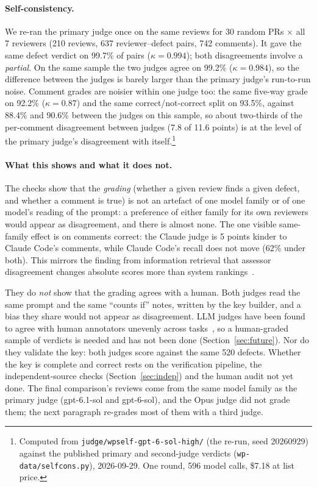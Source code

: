 \documentclass[11pt,a4paper]{article}
\newcommand{\code}[1]{\texttt{#1}}
\begin{document}
\paragraph{Self-consistency.} We re-ran the primary judge once on the same
reviews for 30 random PRs $\times$ all 7 reviewers (210 reviews, 637
reviewer--defect pairs, 742 comments). It gave the same defect verdict on
99.7\% of pairs ($\kappa = 0.994$); both disagreements involve a
\emph{partial}. On the same sample the two judges agree on 99.2\% ($\kappa =
0.984$), so the difference between the judges is barely larger than the
primary judge's run-to-run noise. Comment grades are noisier within one
judge too: the same five-way grade on 92.2\% ($\kappa = 0.87$) and the same
correct/not-correct split on 93.5\%, against 88.4\% and 90.6\% between the
judges on this sample, so about two-thirds of the per-comment disagreement
between judges (7.8 of 11.6 points) is at the level of the primary judge's
disagreement with itself.\footnote{Computed from
\code{judge/wpself-gpt-6-sol-high/} (the re-run, seed 20260929) against the
published primary and second-judge verdicts (\code{wp-data/selfcons.py}),
2026-09-29. One round, 596 model calls, \$7.18 at list price.}

\paragraph{What this shows and what it does not.} The checks show that the
\emph{grading} (whether a given review finds a given defect, and whether a
comment is true) is not an artefact of one model family or of one model's
reading of the prompt: a preference of either family for its own reviewers
would appear as disagreement, and there is almost none. The one visible
same-family effect is on comments correct: the Claude judge is 5 points
kinder to Claude Code's comments, while Claude Code's recall does not move
(62\% under both). This mirrors the finding from information retrieval that
assessor disagreement changes absolute scores more than system
rankings~\cite{voorhees2000}.

They do \emph{not} show that the grading agrees with a human. Both judges
read the same prompt and the same ``counts if'' notes, written by the key
builder, and a bias they share would not appear as disagreement. LLM judges
have been found to agree with human annotators unevenly across
tasks~\cite{bavaresco2025,ahmed2025}, so a human-graded sample of verdicts is
needed and has not been done (Section~\ref{sec:future}). Nor do they
validate the key: both judges score against the same 520 defects. Whether
the key is complete and correct rests on the verification pipeline, the
independent-source checks (Section~\ref{sec:indep}) and the human audit not
yet done. The final comparison's reviews come from the same model family
as the primary judge (gpt-6.1-sol and gpt-6-sol), and the Opus judge did not
grade them; the next paragraph re-grades most of them with a third judge.
\end{document}
